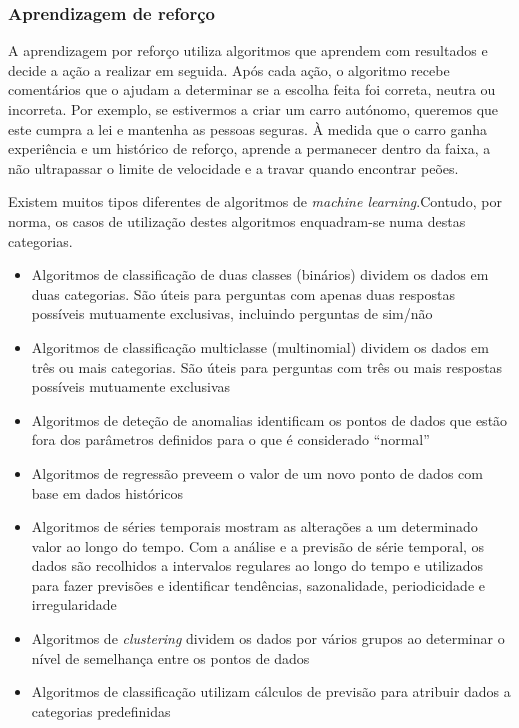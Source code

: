 \documentclass[a4paper,10pt]{article}
\begin{document}
\subsubsection{Aprendizagem de reforço}

A aprendizagem por reforço utiliza algoritmos que aprendem com resultados e decide a ação a realizar em seguida.
Após cada ação, o algoritmo recebe comentários que o ajudam a determinar se a escolha feita foi correta, neutra ou incorreta.
Por exemplo, se estivermos a criar um carro autónomo, queremos que este cumpra a lei e mantenha as pessoas seguras.
À medida que o carro ganha experiência e um histórico de reforço, aprende a permanecer dentro da faixa, a não ultrapassar o limite de velocidade e a travar quando encontrar peões.

Existem muitos tipos diferentes de algoritmos de \textit{machine learning}.Contudo, por norma, os casos de utilização destes algoritmos enquadram-se numa destas categorias.
\begin{itemize}
    \item Algoritmos de classificação de duas classes (binários) dividem os dados em duas categorias. São úteis para perguntas com apenas duas respostas possíveis mutuamente exclusivas, incluindo perguntas de sim/não
    \item Algoritmos de classificação multiclasse (multinomial) dividem os dados em três ou mais categorias. São úteis para perguntas com três ou mais respostas possíveis mutuamente exclusivas
    \item Algoritmos de deteção de anomalias identificam os pontos de dados que estão fora dos parâmetros definidos para o que é considerado ``normal''
    \item Algoritmos de regressão preveem o valor de um novo ponto de dados com base em dados históricos
    \item Algoritmos de séries temporais mostram as alterações a um determinado valor ao longo do tempo. Com a análise e a previsão de série temporal, os dados são recolhidos a intervalos regulares ao longo do tempo e utilizados para fazer previsões e identificar tendências, sazonalidade, periodicidade e irregularidade
    \item Algoritmos de \textit{clustering} dividem os dados por vários grupos ao determinar o nível de semelhança entre os pontos de dados
    \item Algoritmos de classificação utilizam cálculos de previsão para atribuir dados a categorias predefinidas
\end{itemize}
\end{document}
